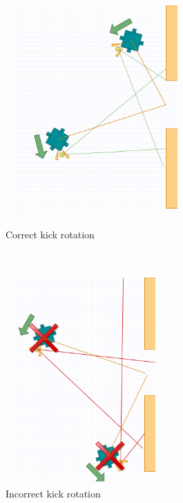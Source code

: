 \documentclass[a4paper,12pt]{article}
\begin{document}
\begin{figure}[ht!]
\begin{minipage}{0.5\textwidth}
\centering
\includegraphics[width=70mm,height=80mm]{goodkick.png}
\caption{Correct kick rotation}
\label{fig:correct}
\end{minipage}
~
\begin{minipage}{0.5\textwidth}
\centering
\includegraphics[width=60mm,height=80mm]{badkick.png}
\caption{Incorrect kick rotation}
\label{fig:incorrect}
\end{minipage}
\end{figure}
\end{document}
